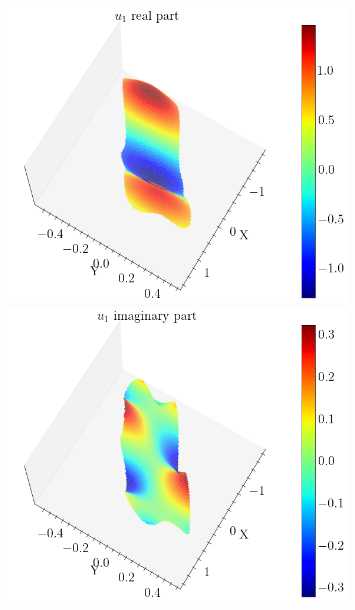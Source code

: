 \begin{figure}[!htb]
    \centering
    \begin{minipage}[b]{0.45\textwidth}
        \centering
        \includegraphics[width=0.8\textwidth]{Images/Dirac/smooth/optimal_lambda3_m_1_u1_re.png}
    \end{minipage}
    \hfill
    \begin{minipage}[b]{0.45\textwidth}
        \centering
        \includegraphics[width=0.8\textwidth]{Images/Dirac/smooth/optimal_lambda3_m_1_u1_im.png}
    \end{minipage}

    \vspace{0.5cm}


\end{figure}
